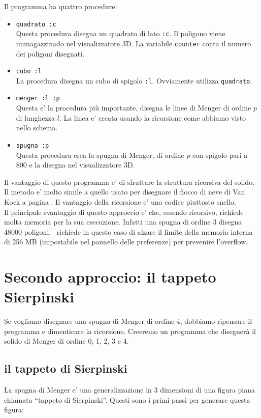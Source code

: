 Il programma ha quattro procedure:
\begin{itemize}
 \item \texttt{quadrato :c}\\
Questa procedura disegna un quadrato di lato \texttt{:c}. Il poligono viene immagazzinado nel visualizzatore 3D. La variabile \texttt{counter} conta il numero dei poligoni disegnati.
 \item \texttt{cubo :l}\\
La procedura disegna un cubo di spigolo \texttt{:l}. Ovviamente utilizza \texttt{quadrato}.
 \item \texttt{menger :l :p}\\
Questa e' la procedura più importante, disegna le linee di Menger di ordine $p$ di lunghezza $l$. La linea e' creata usando la ricorsione come abbiamo visto nello schema.
 \item \texttt{spugna :p}\\
Questa procedura crea la spugna di Menger, di ordine $p$ con spigolo pari a 800 e la disegna nel visualizzatore 3D.
\end{itemize}
\vfill
Il vantaggio di questo programma e' di sfruttare la struttura ricorsiva del solido. Il metodo e' molto simile a quello usato per disegnare il fiocco di neve di Van Kock a pagina \pageref{vankoch}. Il vantaggio della ricorsione e' una codice piuttosto snello.\\
Il principale svantaggio di questo approccio e' che, essendo ricorsivo, richiede molta memoria per la sua esecuzione. Infatti una spugna di ordine 3 disegna 48000 poligoni. \xlogo\ richiede in questo caso di alzare il limite della memoria interna di 256 MB (impostabile nel pannello delle preferenze) per prevenire l'overflow.



\section{Secondo approccio: il tappeto Sierpinski}
Se vogliamo disegnare una spugna di Menger di ordine 4, dobbiamo ripensare il programma e dimenticare la ricorsione. Creeremo un programma che disegnerà il solido di Menger di ordine 0, 1, 2, 3 e 4.

\subsection{il tappeto di Sierpinski}
La spugna di Menger e' una generalizzazione in 3 dimensioni di una figura piana chiamata ``tappeto di Sierpinski''. Questi sono i primi passi per generare questa figura:

